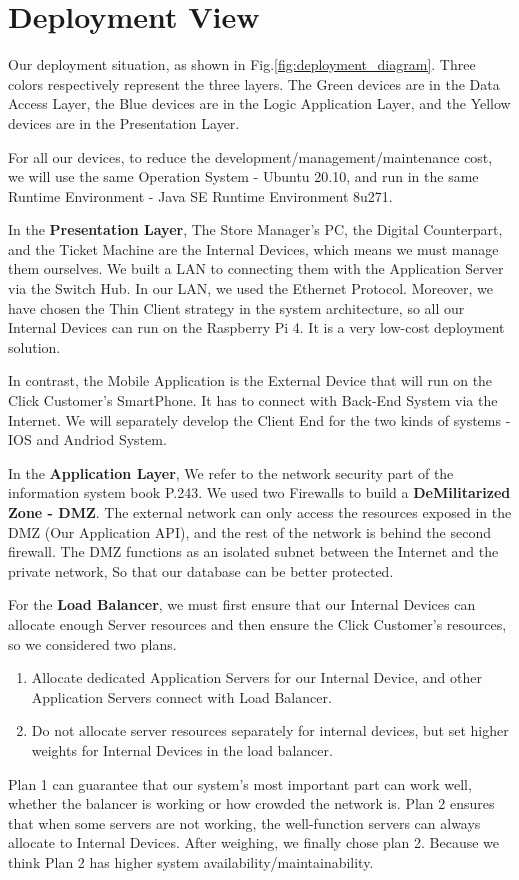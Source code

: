 \documentclass[a4paper,12pt]{report}
\begin{document}
\section{Deployment View}\label{sec:deployment-view}

Our deployment situation, as shown in Fig.\ref{fig:deployment_diagram}.
Three colors respectively represent the three layers.
The Green devices are in the Data Access Layer, the Blue devices are in the Logic Application Layer,
and the Yellow devices are in the Presentation Layer.

For all our devices, to reduce the development/management/maintenance cost,
we will use the same Operation System - Ubuntu 20.10, and run in the same Runtime Environment - Java SE Runtime Environment 8u271.

In the \textbf{Presentation Layer}, The Store Manager's PC, the Digital Counterpart, and the Ticket Machine are the Internal Devices, which means we must manage them ourselves.
We built a LAN to connecting them with the Application Server via the Switch Hub. In our LAN, we used the Ethernet Protocol.
Moreover, we have chosen the Thin Client strategy in the system architecture, so all our Internal Devices can run on the Raspberry Pi 4.
It is a very low-cost deployment solution.

In contrast, the Mobile Application is the External Device that will run on the Click Customer's SmartPhone.
It has to connect with Back-End System via the Internet.
We will separately develop the Client End for the two kinds of systems - IOS and Andriod System.

In the \textbf{Application Layer}, We refer to the network security part of the information system book P.243.
We used two Firewalls to build a \textbf{DeMilitarized Zone - DMZ}.
The external network can only access the resources exposed in the DMZ (Our Application API), and the rest of the network is behind the second firewall.
The DMZ functions as an isolated subnet between the Internet and the private network,
So that our database can be better protected.\cite{SistemiInformativi}

For the \textbf{Load Balancer}, we must first ensure that our Internal Devices can allocate enough Server resources and then ensure the Click Customer's resources, so we considered two plans.
\begin{enumerate}
	\item Allocate dedicated Application Servers for our Internal Device, and other Application Servers connect with Load Balancer.
	\item Do not allocate server resources separately for internal devices, but set higher weights for Internal Devices in the load balancer.
\end{enumerate}
Plan 1 can guarantee that our system's most important part can work well, whether the balancer is working or how crowded the network is.
Plan 2 ensures that when some servers are not working, the well-function servers can always allocate to Internal Devices.
After weighing, we finally chose plan 2.
Because we think Plan 2 has higher system availability/maintainability.
\end{document}
